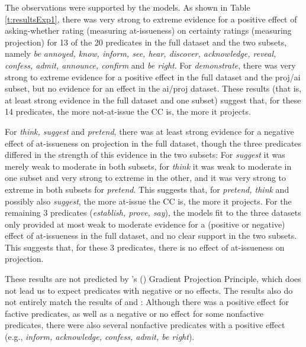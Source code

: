 \documentclass[11pt,fleqn]{article}
\newcommand{\6}{\mbox{$[\hspace*{-.6mm}[$}}
\newcommand{\9}{\mbox{$]\hspace*{-.6mm}]$}}
\newcommand{\citetpos}[1]{\citeauthor{#1}'s (\citeyear{#1})}
\begin{document}
The observations were supported by the models. As shown in Table \ref{t:resultsExp1}, there was very strong to extreme evidence for a positive effect of asking-whether rating (measuring at-issueness) on certainty ratings (measuring projection) for 13 of the 20 predicates in the full dataset and the two subsets, namely {\em be annoyed, know, inform, see, hear, discover, acknowledge, reveal, confess, admit, announce, confirm} and {\em be right}. For {\em demonstrate}, there was very strong to extreme evidence for a positive effect in the full dataset and the proj/ai subset, but no evidence for an effect in the ai/proj dataset. These results (that is, at least strong evidence in the full dataset and one subset) suggest that, for these 14 predicates, the more not-at-issue the CC is, the more it projects. 

For {\em think, suggest} and {\em pretend}, there was at least strong evidence for a negative effect of at-issueness on projection in the full dataset, though the three predicates differed in the strength of this evidence in the two subsets: For {\em suggest} it was merely weak to moderate in both subsets, for {\em think} it was weak to moderate in one subset and very strong to extreme in the other, and it was very strong to extreme in both subsets for {\em pretend}. This suggests that, for {\em pretend, think} and possibly also {\em suggest}, the more at-issue the CC is, the more it projects. For the remaining 3 predicates ({\em establish, prove, say}), the models fit to the three datasets only provided at most weak to moderate evidence for a (positive or negative) effect of at-issueness in the full dataset, and no clear support in the two subsets. This suggests that, for these 3 predicates, there is no effect of at-issueness on projection.

These results are not predicted by \citetpos{tbd-variability} Gradient Projection Principle, which does not lead us to expect predicates with negative or no effects. The results also do not entirely match the results of \cite{djaerv-bacovcin-salt27,djaerv-bacovcin2020} and  \cite{mahler-etal2020}: Although there was a positive effect for factive predicates, as well as a negative or no effect for some nonfactive predicates, there were also several nonfactive predicates with a positive effect (e.g., {\em inform, acknowledge, confess, admit, be right}). 
\end{document}
